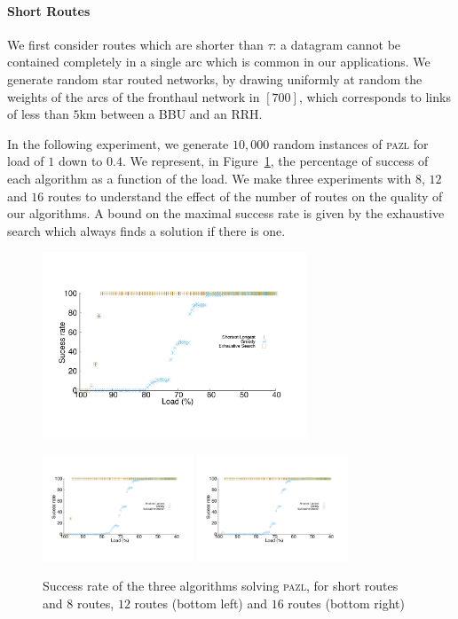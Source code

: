 \documentclass[a4paper,10pt]{journal}
\newcommand\pazl{\textsc{pazl}\xspace}
\begin{document}
    \paragraph{Short Routes}
      
    

 	 We first consider routes which are shorter than $\tau$: a datagram cannot be contained completely in a single arc which is common in our applications. We generate random star routed networks, by drawing uniformly at random the weights of the arcs of the fronthaul network in $[700]$, which corresponds to links of less than $5$km between a BBU and an RRH.

     In the following experiment, we generate $10,000$ random instances of \pazl for load of $1$ down to $0.4$. We represent, in Figure~\ref{fig:short}, the percentage of success of each algorithm as a function of the load. We make three experiments with $8$, $12$ and $16$ routes to understand the effect of the number of routes on the quality of our algorithms. A bound on the maximal success rate is given by the exhaustive search which always finds a solution if there is one. 
       
      \begin{figure}[h]
      \begin{center}
	 \includegraphics[width=0.7\textwidth]{pazlshort8.pdf}

	 \includegraphics[width=0.4\textwidth]{pazlshort12.pdf}
	 \includegraphics[width=0.4\textwidth]{pazlshort16.pdf}
      \end{center}
      \caption{Success rate of the three algorithms solving \pazl, for short routes and $8$ routes, $12$ routes (bottom left) and $16$ routes (bottom right)}\label{fig:short}
      \end{figure}
\end{document}
